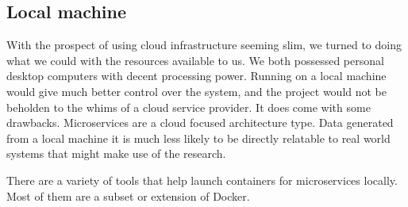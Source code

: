 \subsection{Local machine}
With the prospect of using cloud infrastructure seeming slim, we turned to doing what we could with the resources available to us. We both possessed personal desktop computers with decent processing power. 
Running on a local machine would give much better control over the system, and the project would not be beholden to the whims of a cloud service provider. 
It does come with some drawbacks. Microservices are a cloud focused architecture type. Data generated from a local machine it is much less likely to be directly relatable to real world systems that might make use of the research.

There are a variety of tools that help launch containers for microservices locally. Most of them are a subset or extension of Docker. 